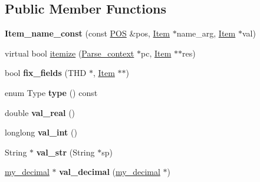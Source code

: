 \subsection*{Public Member Functions}
\begin{DoxyCompactItemize}
\item 
\mbox{\label{classItem__name__const_a9e31c297e9463133f85e03925b5fc516}} 
{\bfseries Item\+\_\+name\+\_\+const} (const \mbox{\hyperlink{structYYLTYPE}{P\+OS}} \&pos, \mbox{\hyperlink{classItem}{Item}} $\ast$name\+\_\+arg, \mbox{\hyperlink{classItem}{Item}} $\ast$val)
\item 
virtual bool \mbox{\hyperlink{classItem__name__const_ae8394eda20cb84282f9f6ea43fb6eacd}{itemize}} (\mbox{\hyperlink{structParse__context}{Parse\+\_\+context}} $\ast$pc, \mbox{\hyperlink{classItem}{Item}} $\ast$$\ast$res)
\item 
\mbox{\label{classItem__name__const_a0479fb9a1d7927145cd55b3efe29e736}} 
bool {\bfseries fix\+\_\+fields} (T\+HD $\ast$, \mbox{\hyperlink{classItem}{Item}} $\ast$$\ast$)
\item 
\mbox{\label{classItem__name__const_a3324a422d042d99e02de8ccac355ea0c}} 
enum Type {\bfseries type} () const
\item 
\mbox{\label{classItem__name__const_acbc58e3421590b04d811e6308396a74c}} 
double {\bfseries val\+\_\+real} ()
\item 
\mbox{\label{classItem__name__const_aae81f17c61c7300ece1f6ed1599406dc}} 
longlong {\bfseries val\+\_\+int} ()
\item 
\mbox{\label{classItem__name__const_a7fdedecbce2ca63110daa08a08099895}} 
String $\ast$ {\bfseries val\+\_\+str} (String $\ast$sp)
\item 
\mbox{\label{classItem__name__const_a224998dfa89a9f8cb0031bd6fac6f474}} 
\mbox{\hyperlink{classmy__decimal}{my\+\_\+decimal}} $\ast$ {\bfseries val\+\_\+decimal} (\mbox{\hyperlink{classmy__decimal}{my\+\_\+decimal}} $\ast$)
\item 
\mbox{\label{classItem__name__const_ae061112b76e5fd1b2a96d4fc1b009a1f}} 

\end{DoxyCompactItemize}
